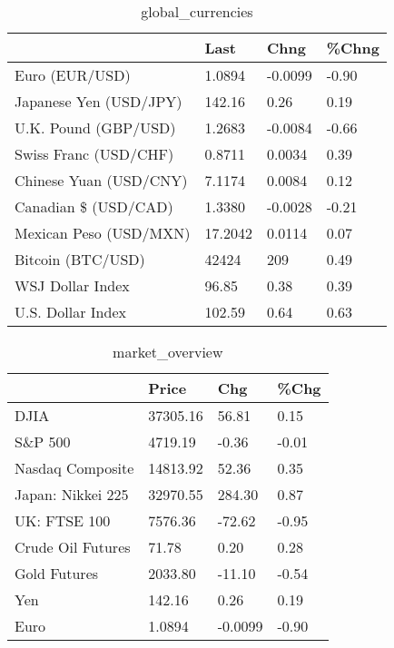 \documentclass{article}%
\begin{document}
%


\begin{table}[htbp]%
\caption{global\_currencies}%
\centering%
\begin{adjustbox}{width=1\textwidth}%
\begin{tabular}{llll}
\toprule
                       &    Last &    Chng & \%Chng \\
\midrule
        Euro (EUR/USD) &  1.0894 & -0.0099 & -0.90 \\
Japanese Yen (USD/JPY) &  142.16 &    0.26 &  0.19 \\
  U.K. Pound (GBP/USD) &  1.2683 & -0.0084 & -0.66 \\
 Swiss Franc (USD/CHF) &  0.8711 &  0.0034 &  0.39 \\
Chinese Yuan (USD/CNY) &  7.1174 &  0.0084 &  0.12 \\
  Canadian \$ (USD/CAD) &  1.3380 & -0.0028 & -0.21 \\
Mexican Peso (USD/MXN) & 17.2042 &  0.0114 &  0.07 \\
     Bitcoin (BTC/USD) &   42424 &     209 &  0.49 \\
      WSJ Dollar Index &   96.85 &    0.38 &  0.39 \\
     U.S. Dollar Index &  102.59 &    0.64 &  0.63 \\
\bottomrule
\end{tabular}
%
\end{adjustbox}%
\end{table}

%


\begin{table}[htbp]%
\caption{market\_overview}%
\centering%
\begin{adjustbox}{width=1\textwidth}%
\begin{tabular}{llll}
\toprule
                  &    Price &     Chg &  \%Chg \\
\midrule
             DJIA & 37305.16 &   56.81 &  0.15 \\
          S\&P 500 &  4719.19 &   -0.36 & -0.01 \\
 Nasdaq Composite & 14813.92 &   52.36 &  0.35 \\
Japan: Nikkei 225 & 32970.55 &  284.30 &  0.87 \\
     UK: FTSE 100 &  7576.36 &  -72.62 & -0.95 \\
Crude Oil Futures &    71.78 &    0.20 &  0.28 \\
     Gold Futures &  2033.80 &  -11.10 & -0.54 \\
              Yen &   142.16 &    0.26 &  0.19 \\
             Euro &   1.0894 & -0.0099 & -0.90 \\
\bottomrule
\end{tabular}
%
\end{adjustbox}%
\end{table}

%
\end{document}
